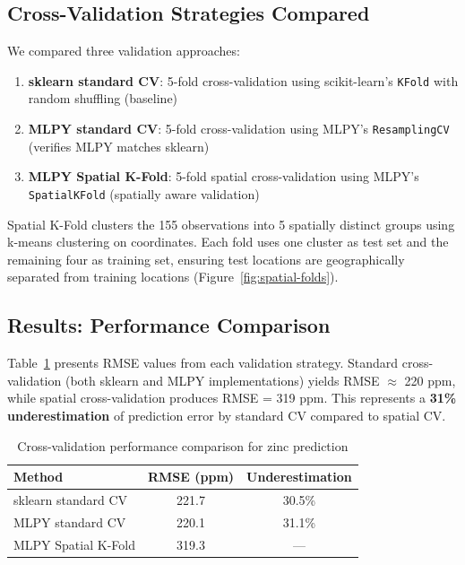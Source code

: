 \documentclass[review,12pt]{elsarticle}
\begin{document}
\subsection{Cross-Validation Strategies Compared}

We compared three validation approaches:

\begin{enumerate}
\item \textbf{sklearn standard CV}: 5-fold cross-validation using scikit-learn's \texttt{KFold} with random shuffling (baseline)
\item \textbf{MLPY standard CV}: 5-fold cross-validation using MLPY's \texttt{ResamplingCV} (verifies MLPY matches sklearn)
\item \textbf{MLPY Spatial K-Fold}: 5-fold spatial cross-validation using MLPY's \texttt{SpatialKFold} (spatially aware validation)
\end{enumerate}

Spatial K-Fold clusters the 155 observations into 5 spatially distinct groups using k-means clustering on coordinates. Each fold uses one cluster as test set and the remaining four as training set, ensuring test locations are geographically separated from training locations (Figure~\ref{fig:spatial-folds}).

\subsection{Results: Performance Comparison}

Table~\ref{tab:cv-results} presents RMSE values from each validation strategy. Standard cross-validation (both sklearn and MLPY implementations) yields RMSE $\approx$ 220 ppm, while spatial cross-validation produces RMSE = 319 ppm. This represents a \textbf{31\% underestimation} of prediction error by standard CV compared to spatial CV.

\begin{table}[ht]
\centering
\caption{Cross-validation performance comparison for zinc prediction}
\label{tab:cv-results}
\begin{tabular}{lcc}
\toprule
Method & RMSE (ppm) & Underestimation \\
\midrule
sklearn standard CV & 221.7 & 30.5\% \\
MLPY standard CV & 220.1 & 31.1\% \\
MLPY Spatial K-Fold & 319.3 & --- \\
\bottomrule
\end{tabular}
\end{table}
\end{document}
